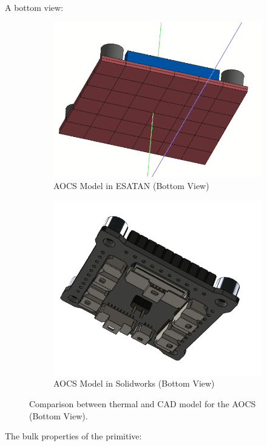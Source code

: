 A bottom view:

\begin{figure}[H]
    \centering
    \begin{subfigure}{.5\textwidth}
      \centering
      \includegraphics[width=.6\linewidth]{res/img/5_simulationanalisys/Comparisons/ESATAN/AOCS_raw.PNG}
      \caption{AOCS Model in ESATAN (Bottom View)}
      \label{fig:aocsraw}
    \end{subfigure}%
    \begin{subfigure}{.5\textwidth}
      \centering
      \includegraphics[width=.5\linewidth]{res/img/5_simulationanalisys/Comparisons/SLDW/AOCS_Bot_Solid.PNG}
      \caption{AOCS Model in Solidworks (Bottom View)}
      \label{fig:aocsrawsolid}
    \end{subfigure}
    \caption{Comparison between thermal and CAD model for the AOCS (Bottom View).}
    \label{fig:aocsrawim}
\end{figure}

The bulk properties of the primitive:

